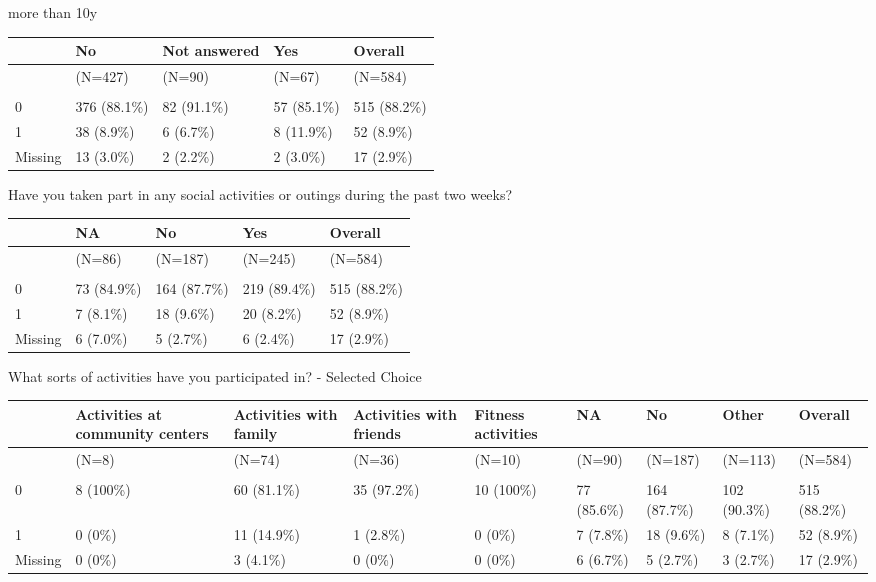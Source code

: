 \documentclass[
]{article}
\begin{document}
more than 10y

\begin{tabular}[t]{lllll}
\toprule
  & No & Not answered & Yes & Overall\\
\midrule
 & (N=427) & (N=90) & (N=67) & (N=584)\\
\addlinespace[0.3em]
\multicolumn{5}{l}{\textbf{piab\_pos}}\\
\hspace{1em}0 & 376 (88.1\%) & 82 (91.1\%) & 57 (85.1\%) & 515 (88.2\%)\\
\hspace{1em}1 & 38 (8.9\%) & 6 (6.7\%) & 8 (11.9\%) & 52 (8.9\%)\\
\hspace{1em}Missing & 13 (3.0\%) & 2 (2.2\%) & 2 (3.0\%) & 17 (2.9\%)\\
\bottomrule
\end{tabular}

Have you taken part in any social activities or outings during the past
two weeks?

\begin{tabular}[t]{lllll}
\toprule
  & NA & No & Yes & Overall\\
\midrule
 & (N=86) & (N=187) & (N=245) & (N=584)\\
\addlinespace[0.3em]
\multicolumn{5}{l}{\textbf{piab\_pos}}\\
\hspace{1em}0 & 73 (84.9\%) & 164 (87.7\%) & 219 (89.4\%) & 515 (88.2\%)\\
\hspace{1em}1 & 7 (8.1\%) & 18 (9.6\%) & 20 (8.2\%) & 52 (8.9\%)\\
\hspace{1em}Missing & 6 (7.0\%) & 5 (2.7\%) & 6 (2.4\%) & 17 (2.9\%)\\
\bottomrule
\end{tabular}

What sorts of activities have you participated in? - Selected Choice

\begin{tabular}[t]{lllllllll}
\toprule
  & Activities at community centers & Activities with family & Activities with friends & Fitness activities & NA & No & Other & Overall\\
\midrule
 & (N=8) & (N=74) & (N=36) & (N=10) & (N=90) & (N=187) & (N=113) & (N=584)\\
\addlinespace[0.3em]
\multicolumn{9}{l}{\textbf{piab\_pos}}\\
\hspace{1em}0 & 8 (100\%) & 60 (81.1\%) & 35 (97.2\%) & 10 (100\%) & 77 (85.6\%) & 164 (87.7\%) & 102 (90.3\%) & 515 (88.2\%)\\
\hspace{1em}1 & 0 (0\%) & 11 (14.9\%) & 1 (2.8\%) & 0 (0\%) & 7 (7.8\%) & 18 (9.6\%) & 8 (7.1\%) & 52 (8.9\%)\\
\hspace{1em}Missing & 0 (0\%) & 3 (4.1\%) & 0 (0\%) & 0 (0\%) & 6 (6.7\%) & 5 (2.7\%) & 3 (2.7\%) & 17 (2.9\%)\\
\bottomrule
\end{tabular}
\end{document}
